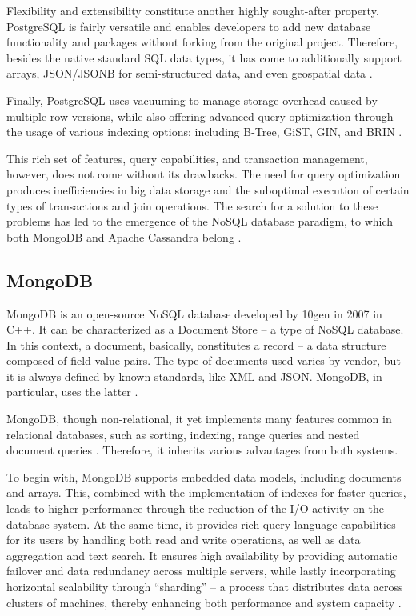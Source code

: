 \documentclass[conference]{IEEEtran}
\begin{document}
Flexibility and extensibility constitute another highly sought-after property. PostgreSQL is fairly versatile and enables developers to add new database functionality and packages without forking from the original project. Therefore, besides the native standard SQL data types, it has come to additionally support arrays, JSON/JSONB for semi-structured data, and even geospatial data \cite{b9,b12,b13}.

Finally, PostgreSQL uses vacuuming to manage storage overhead caused by multiple row versions, while also offering advanced query optimization through the usage of various indexing options; including B-Tree, GiST, GIN, and BRIN \cite{b9}.

This rich set of features, query capabilities, and transaction management, however, does not come without its drawbacks. The need for query optimization produces inefficiencies in big data storage and the suboptimal execution of certain types of transactions and join operations. The search for a solution to these problems has led to the emergence of the NoSQL database paradigm, to which both MongoDB and Apache Cassandra belong \cite{b14}.


\subsection{MongoDB}

MongoDB is an open-source NoSQL database developed by 10gen in 2007 in C++. It can be characterized as a Document Store – a type of NoSQL database. In this context, a document, basically, constitutes a record – a data structure composed of field value pairs. The type of documents used varies by vendor, but it is always defined by known standards, like XML and JSON. MongoDB, in particular, uses the latter \cite{b8, b14, b15}.

MongoDB, though non-relational, it yet implements many features common in relational databases, such as sorting, indexing, range queries and nested document queries \cite{b8}. Therefore, it inherits various advantages from both systems.

To begin with, MongoDB supports embedded data models, including documents and arrays. This, combined with the implementation of indexes for faster queries, leads to higher performance through the reduction of the I/O activity on the database system. At the same time, it provides rich query language capabilities for its users by handling both read and write operations, as well as data aggregation and text search. It ensures high availability by providing automatic failover and data redundancy across multiple servers, while lastly incorporating horizontal scalability through “sharding” – a process that distributes data across clusters of machines, thereby enhancing both performance and system capacity \cite{b15}.
\end{document}
